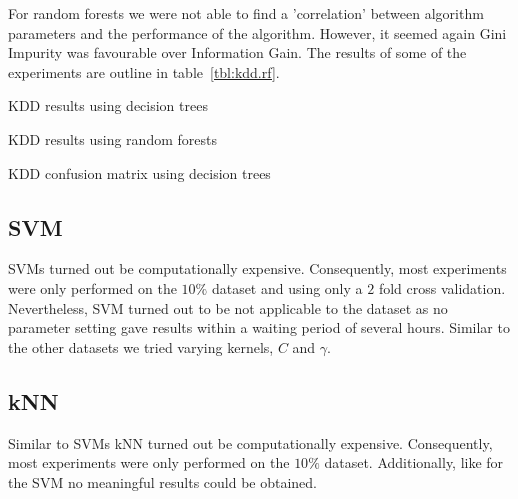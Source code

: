 For random forests we were not able to find a 'correlation' between algorithm parameters and the performance of the algorithm. 
However, it seemed again Gini Impurity was favourable over Information Gain. 
The results of some of the experiments are outline in table~\ref{tbl:kdd.rf}. 

\begin{table}[htb]
\centering

\caption{KDD results using decision trees}
\label{tbl:kdd.dt}
\end{table}

\begin{table}[htb]
\centering

\caption{KDD results using random forests}
\label{tbl:kdd.rf}
\end{table}

\begin{table}[hbt]
\centering
\resizebox{\linewidth}{!}{}
\caption{KDD confusion matrix using decision trees}
\label{tbl:kdd.dt.cm}
\end{table}

\subsection{SVM}
SVMs turned out be computationally expensive. 
Consequently, most experiments were only performed on the $10\%$ dataset and using only a $2$ fold cross validation. 
Nevertheless, SVM turned out to be not applicable to the dataset as no parameter setting gave results within a waiting period of several hours. 
Similar to the other datasets we tried varying kernels, $C$ and $\gamma$. 

\subsection{kNN}
Similar to SVMs kNN turned out be computationally expensive. 
Consequently, most experiments were only performed on the $10\%$ dataset. 
Additionally, like for the SVM no meaningful results could be obtained. 
